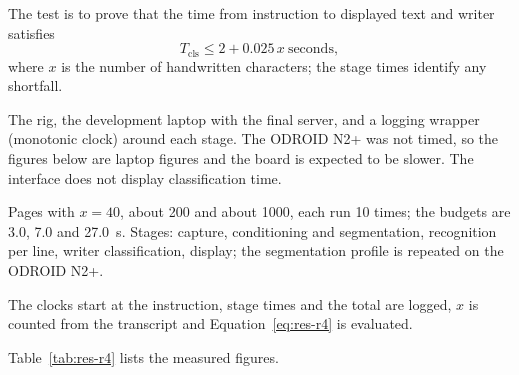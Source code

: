 
            The test is to prove that the time from instruction to displayed text and writer satisfies
            \begin{equation}
            \label{eq:res-r4}
            T_{\mathrm{cls}}\le 2+0.025\,x\ \text{seconds},
            \end{equation}
            where $x$ is the number of handwritten characters; the stage times identify any shortfall.


            The rig, the development laptop with the final server, and a logging wrapper (monotonic clock) around each stage. The ODROID N2+ was not timed, so the figures below are laptop figures and the board is expected to be slower. The interface does not display classification time.


            Pages with $x=40$, about 200 and about 1000, each run 10 times; the budgets are 3.0, 7.0 and 27.0~s.
            Stages: capture, conditioning and segmentation, recognition per line, writer classification, display; the segmentation profile is repeated on the ODROID N2+.


            The clocks start at the instruction, stage times and the total are logged, $x$ is counted from the transcript and Equation~\ref{eq:res-r4} is evaluated.


            Table~\ref{tab:res-r4} lists the measured figures.

